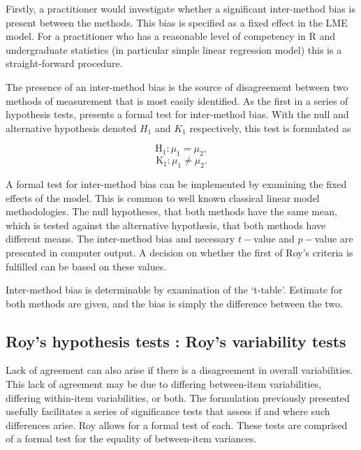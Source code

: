 \documentclass[12pt, a4paper]{report}
\theoremstyle{plain}
\theoremstyle{definition}
\theoremstyle{remark}
\begin{document}
	Firstly, a practitioner would investigate whether a significant inter-method bias is present between the methods. This bias is specified as a fixed effect in the LME model.  For a practitioner who has a reasonable level of competency in R and undergraduate statistics (in particular simple linear regression model) this is a straight-forward procedure.
	
	The presence of an inter-method bias is the source of disagreement between two methods of measurement that is most easily identified. As the first in a series of hypothesis tests, \citet{ARoy2009} presents a formal test for inter-method bias. With the null and alternative hypothesis denoted $H_1$ and $K_1$ respectively, this test is formulated as
	
	\[	\operatorname{H_1} : \mu_1 = \mu_2 ,\]
	\[	\operatorname{K_1} : \mu_1 \neq \mu_2.\]
	
	
	
	
	A formal test for inter-method bias can be implemented by examining the fixed effects of the model. This is common to well known classical linear model methodologies. The null hypotheses, that both methods have the same mean, which is tested against the alternative hypothesis, that both methods have different means.
	The inter-method bias and necessary $t-$value and $p-$value are presented in computer output. A decision on whether the first of Roy's criteria is fulfilled can be based on these values.
	
	
	Inter-method bias is determinable by examination of the `t-table'. Estimate for both methods are given, and the bias is simply the difference between the two. 
	
	

	\subsection{Roy's hypothesis tests : Roy's variability tests}
	
	Lack of agreement can also arise if there is a disagreement in overall variabilities. This lack of agreement may be due to differing between-item variabilities, differing within-item variabilities, or both. The formulation previously presented usefully facilitates a series of significance tests that assess if and where such differences arise. Roy allows for a formal test of each. These tests are comprised of a formal test for the equality of between-item variances.
	
\end{document}
